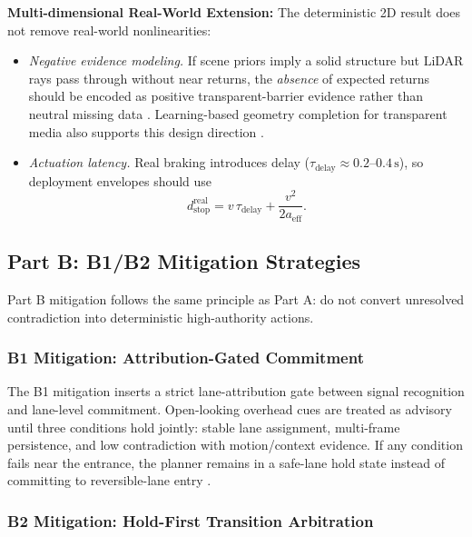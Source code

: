 \documentclass[sigconf,nonacm]{acmart}
\begin{document}
\textbf{Multi-dimensional Real-World Extension:} The deterministic 2D result does not remove real-world nonlinearities:
\begin{itemize}
  \item \textit{Negative evidence modeling.} If scene priors imply a solid structure but LiDAR rays pass through without near returns, the \textit{absence} of expected returns should be encoded as positive transparent-barrier evidence rather than neutral missing data \cite{tibebu2021glass}. Learning-based geometry completion for transparent media also supports this design direction \cite{sajjanar2019cleargrasp}.
  \item \textit{Actuation latency.} Real braking introduces delay ($\tau_{\text{delay}}\approx 0.2\text{--}0.4\,\mathrm{s}$), so deployment envelopes should use
  \begin{equation}
  d_{\text{stop}}^{\text{real}} = v\,\tau_{\text{delay}} + \frac{v^2}{2a_{\text{eff}}}.
  \label{eq:d_stop_real}
  \end{equation}
\end{itemize}

\subsection{Part B: B1/B2 Mitigation Strategies}

Part B mitigation follows the same principle as Part A: do not convert unresolved contradiction into deterministic high-authority actions.

\subsubsection{B1 Mitigation: Attribution-Gated Commitment}

The B1 mitigation inserts a strict lane-attribution gate between signal recognition and lane-level commitment. Open-looking overhead cues are treated as advisory until three conditions hold jointly: stable lane assignment, multi-frame persistence, and low contradiction with motion/context evidence. If any condition fails near the entrance, the planner remains in a safe-lane hold state instead of committing to reversible-lane entry \cite{hirabayashi2019,monninger2023}.

\subsubsection{B2 Mitigation: Hold-First Transition Arbitration}
\end{document}
